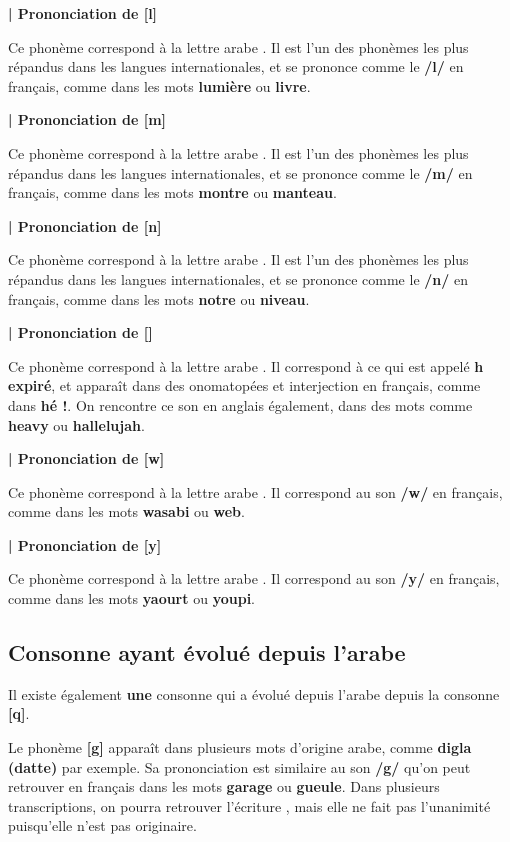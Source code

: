 \textbf{| Prononciation de   [l]}

Ce phonème correspond à la lettre arabe . Il est l'un des phonèmes les plus répandus dans les langues internationales, et se prononce comme le \textbf{/l/} en français, comme dans les mots \textbf{lumière} ou \textbf{livre}.


\textbf{| Prononciation de   [m]}

Ce phonème correspond à la lettre arabe . Il est l'un des phonèmes les plus répandus dans les langues internationales, et se prononce comme le \textbf{/m/} en français, comme dans les mots \textbf{montre} ou \textbf{manteau}.


\textbf{| Prononciation de   [n]}

Ce phonème correspond à la lettre arabe . Il est l'un des phonèmes les plus répandus dans les langues internationales, et se prononce comme le \textbf{/n/} en français, comme dans les mots \textbf{notre} ou \textbf{niveau}.


\textbf{| Prononciation de  [\texthth]}

Ce phonème correspond à la lettre arabe . Il correspond à ce qui est appelé \textbf{h expiré}, et apparaît dans des onomatopées et interjection en français, comme dans \textbf{hé !}. On rencontre ce son en anglais également, dans des mots comme \textbf{heavy} ou \textbf{hallelujah}.


\textbf{| Prononciation de  [w]}

Ce phonème correspond à la lettre arabe . Il correspond au son \textbf{/w/} en français, comme dans les mots \textbf{wasabi} ou \textbf{web}.


\textbf{| Prononciation de  [y]}

Ce phonème correspond à la lettre arabe . Il correspond au son \textbf{/y/} en français, comme dans les mots \textbf{yaourt} ou \textbf{youpi}.


\subsection{Consonne ayant évolué depuis l'arabe}

Il existe également \textbf{une} consonne qui a évolué depuis l'arabe depuis la  consonne \textbf{ [q]}.

Le phonème \textbf{[g]} apparaît dans plusieurs mots d'origine arabe, comme \textbf{digla (datte)} par exemple. Sa prononciation est similaire au son \textbf{/g/} qu'on peut retrouver en français dans les mots \textbf{garage} ou \textbf{gueule}. Dans plusieurs transcriptions, on pourra retrouver l'écriture \textbf{}, mais elle ne fait pas l'unanimité puisqu'elle n'est pas originaire.

